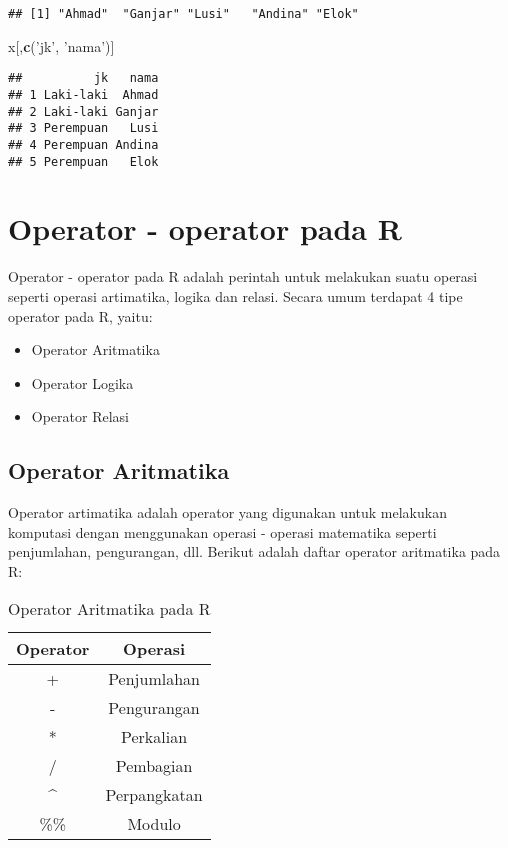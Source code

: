 \documentclass[
]{book}
\newenvironment{Shaded}{\begin{snugshade}}{\end{snugshade}}
\newcommand{\KeywordTok}[1]{\textcolor[rgb]{0.13,0.29,0.53}{\textbf{#1}}}
\newcommand{\NormalTok}[1]{#1}
\newcommand{\StringTok}[1]{\textcolor[rgb]{0.31,0.60,0.02}{#1}}
\providecommand{\tightlist}{%
  \setlength{\itemsep}{0pt}\setlength{\parskip}{0pt}}
\begin{document}
\begin{verbatim}
## [1] "Ahmad"  "Ganjar" "Lusi"   "Andina" "Elok"
\end{verbatim}

\begin{Shaded}
\begin{Highlighting}[]
\NormalTok{x[,}\KeywordTok{c}\NormalTok{(}\StringTok{'jk'}\NormalTok{, }\StringTok{'nama'}\NormalTok{)]}
\end{Highlighting}
\end{Shaded}

\begin{verbatim}
##          jk   nama
## 1 Laki-laki  Ahmad
## 2 Laki-laki Ganjar
## 3 Perempuan   Lusi
## 4 Perempuan Andina
## 5 Perempuan   Elok
\end{verbatim}

\hypertarget{operator---operator-pada-r}{%
\chapter{Operator - operator pada R}\label{operator---operator-pada-r}}

Operator - operator pada R adalah perintah untuk melakukan suatu operasi seperti operasi artimatika, logika dan relasi. Secara umum terdapat 4 tipe operator pada R, yaitu:

\begin{itemize}
\tightlist
\item
  Operator Aritmatika
\item
  Operator Logika
\item
  Operator Relasi
\end{itemize}

\hypertarget{operator}{%
\section{Operator Aritmatika}\label{operator}}

Operator artimatika adalah operator yang digunakan untuk melakukan komputasi dengan menggunakan operasi - operasi matematika seperti penjumlahan, pengurangan, dll. Berikut adalah daftar operator aritmatika pada R:

\begin{table}

\caption{\label{tab:unnamed-chunk-23}Operator Aritmatika pada R}
\centering
\begin{tabular}[t]{cc}
\toprule
Operator & Operasi\\
\midrule
+ & Penjumlahan\\
- & Pengurangan\\
* & Perkalian\\
/ & Pembagian\\
\textasciicircum{} & Perpangkatan\\
\addlinespace
\%\% & Modulo\\
\bottomrule
\end{tabular}
\end{table}
\end{document}
